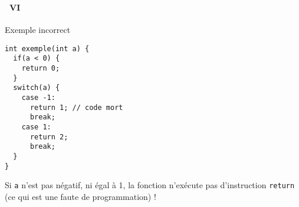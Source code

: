 \begin{frame}[containsverbatim]
  \frametitle{\secname}
  \framesubtitle{\subsecname~VI}

  {\footnotesize\begin{exampleblock}{Exemple incorrect}
    \begin{verbatim}
int exemple(int a) {
  if(a < 0) {
    return 0;
  }
  switch(a) {
    case -1:
      return 1; // code mort
      break;
    case 1:
      return 2;
      break;
  }
}\end{verbatim}
  \end{exampleblock}}
  Si \verb|a| n'est pas négatif, ni égal à 1, la fonction n'exécute pas d'instruction \verb|return| (ce qui est une faute de programmation) !
\end{frame}

